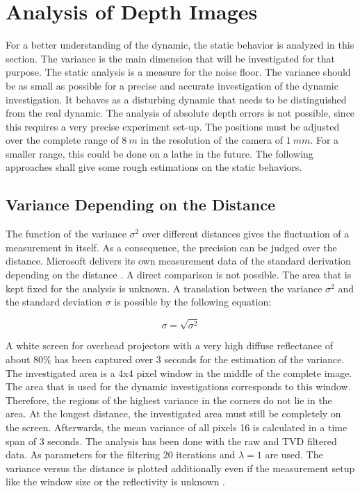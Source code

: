 \section{Analysis of Depth Images} \label{sec:static_evaluation}
For a better understanding of the dynamic, the static behavior is analyzed in this section. The variance is the main dimension that will be investigated for that purpose. The static analysis is a measure for the noise floor. The variance should be as small as possible for a precise and accurate investigation of the dynamic investigation. It behaves as a disturbing dynamic that needs to be distinguished from the real dynamic. The analysis of absolute depth errors is not possible, since this requires a very precise experiment set-up. The positions must be adjusted over the complete range of $8~m$ in the resolution of the camera of $1~mm$. For a smaller range, this could be done on a lathe in the future. The following approaches shall give some rough estimations on the static behaviors. 

\subsection{Variance Depending on the Distance}   
The function of the variance $\sigma^2$ over different distances gives the fluctuation of a measurement in itself. As a consequence, the precision can be judged over the distance. Microsoft delivers its own measurement data of the standard derivation depending on the distance \cite{payne20147}. A direct comparison is not possible. The area that is kept fixed for the analysis is unknown. A translation between the variance $\sigma^2$ and the standard deviation $\sigma$ is possible by the following equation:

\begin{equation}
\sigma = \sqrt{\sigma^2}
\end{equation}

A white screen for overhead projectors with a very high diffuse reflectance of about $80\%$ has been captured over 3 seconds for the estimation of the variance. The investigated area is a 4x4 pixel window in the middle of the complete image. The area that is used for the dynamic investigations corresponds to this window. Therefore, the regions of the highest variance in the corners do not lie in the area. At the longest distance, the investigated area must still be completely on the screen. Afterwards, the mean variance of all pixels 16 is calculated in a time span of 3 seconds. The analysis has been done with the raw and TVD filtered data. As parameters for the filtering 20 iterations and $\lambda =1$ are used. The variance versus the distance is plotted additionally even if the measurement setup like the window size or the reflectivity is unknown \cite{payne20147}. 


